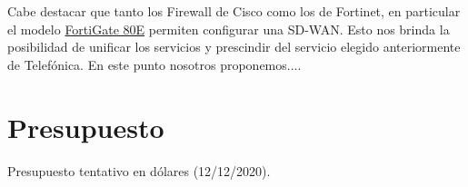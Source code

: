 \documentclass[11pt]{article}
\begin{document}
    Cabe destacar que tanto los Firewall de Cisco como los de Fortinet, en particular el modelo 
    \href{https://www.fortinet.com/content/dam/fortinet/assets/data-sheets/FortiGate_80E_Series.pdf}{FortiGate 80E} permiten configurar una SD-WAN. Esto nos brinda la 
    posibilidad de unificar los servicios y prescindir del servicio elegido anteriormente de Telefónica. En este punto nosotros proponemos....

    \section{Presupuesto}

    \begin{table}[H]
        \centering
        
        \caption{Presupuesto tentativo en dólares (12/12/2020).}
    \end{table}

    
\end{document}
